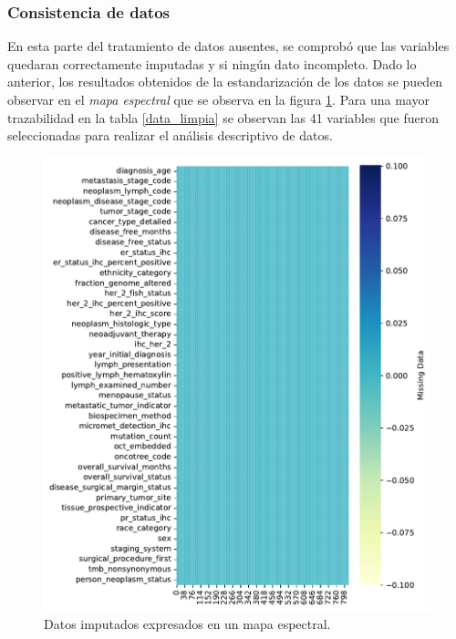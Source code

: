 \subsubsection{Consistencia de datos}
En esta parte del tratamiento de datos ausentes, se comprobó que las variables quedaran correctamente imputadas y si ningún dato incompleto. Dado lo anterior, los resultados obtenidos de la estandarización de los datos se pueden observar en el \textit{mapa espectral} que se observa en la figura \ref{impute_Spectrum}. Para una mayor trazabilidad en la tabla \ref{data_limpia} se observan las 41 variables que fueron seleccionadas para realizar el análisis descriptivo de datos.
\begin{figure}[htb!]
	\centering
	\includegraphics[width=0.85
	\linewidth]{NOTEBOOK/IMAGENES_PERDIDAS/impute_heatmap}
	\caption{Datos imputados expresados en un mapa espectral.}
	\label{impute_Spectrum}
\end{figure}


